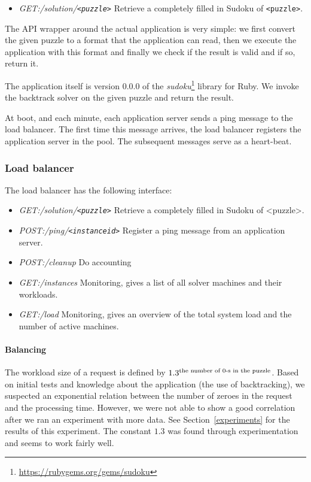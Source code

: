 		\begin{itemize}
			\item \emph{GET:/solution/\texttt{<puzzle>}} Retrieve a completely filled in Sudoku of \texttt{<puzzle>}.
		\end{itemize}

		The API wrapper around the actual application is very simple:
		we first convert the given puzzle to a format that the application can read, then we execute the application with this format and finally we check if the result is valid and if so, return it.

		The application itself is version 0.0.0 of the \textit{sudoku}\footnote{\url{https://rubygems.org/gems/sudoku}} library for Ruby.
		We invoke the backtrack solver on the given puzzle and return the result.
		
		At boot, and each minute, each application server sends a ping message to the load balancer.
		The first time this message arrives, the load balancer registers the application server in the pool.
		The subsequent messages serve as a heart-beat.
	\subsubsection{Load balancer}
		\label{sys:arch:load}

		The load balancer has the following interface:
		\begin{itemize}
			\item \emph{GET:/solution/\texttt{<puzzle>}} Retrieve a completely filled in Sudoku of <puzzle>.
			\item \emph{POST:/ping/\texttt{<instanceid>}} Register a ping message from an application server.
			\item \emph{POST:/cleanup} Do accounting
			\item \emph{GET:/instances} Monitoring, gives a list of all solver machines and their workloads.
			\item \emph{GET:/load} Monitoring, gives an overview of the total system load and the number of active machines.
		\end{itemize}
		
		\paragraph{Balancing}
			The workload size of a request is defined by $1.3^\textnormal{the number of 0-s in the puzzle}$.
			Based on initial tests and knowledge about the application (the use of backtracking), we suspected an exponential relation between the number of zeroes in the request and the processing time.
			However, we were not able to show a good correlation after we ran an experiment with more data.
			See Section~\ref{experiments} for the results of this experiment.
			The constant $1.3$ was found through experimentation and seems to work fairly well.
			

